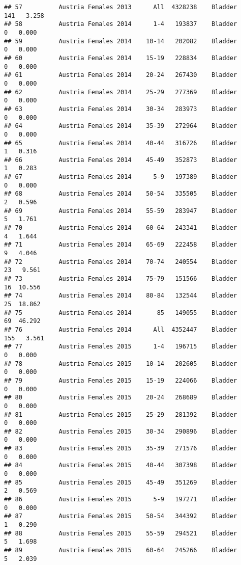 \documentclass[
]{article}
\begin{document}
\begin{verbatim}
## 57          Austria Females 2013      All  4328238    Bladder    141   3.258
## 58          Austria Females 2014      1-4   193837    Bladder      0   0.000
## 59          Austria Females 2014    10-14   202082    Bladder      0   0.000
## 60          Austria Females 2014    15-19   228834    Bladder      0   0.000
## 61          Austria Females 2014    20-24   267430    Bladder      0   0.000
## 62          Austria Females 2014    25-29   277369    Bladder      0   0.000
## 63          Austria Females 2014    30-34   283973    Bladder      0   0.000
## 64          Austria Females 2014    35-39   272964    Bladder      0   0.000
## 65          Austria Females 2014    40-44   316726    Bladder      1   0.316
## 66          Austria Females 2014    45-49   352873    Bladder      1   0.283
## 67          Austria Females 2014      5-9   197389    Bladder      0   0.000
## 68          Austria Females 2014    50-54   335505    Bladder      2   0.596
## 69          Austria Females 2014    55-59   283947    Bladder      5   1.761
## 70          Austria Females 2014    60-64   243341    Bladder      4   1.644
## 71          Austria Females 2014    65-69   222458    Bladder      9   4.046
## 72          Austria Females 2014    70-74   240554    Bladder     23   9.561
## 73          Austria Females 2014    75-79   151566    Bladder     16  10.556
## 74          Austria Females 2014    80-84   132544    Bladder     25  18.862
## 75          Austria Females 2014       85   149055    Bladder     69  46.292
## 76          Austria Females 2014      All  4352447    Bladder    155   3.561
## 77          Austria Females 2015      1-4   196715    Bladder      0   0.000
## 78          Austria Females 2015    10-14   202605    Bladder      0   0.000
## 79          Austria Females 2015    15-19   224066    Bladder      0   0.000
## 80          Austria Females 2015    20-24   268689    Bladder      0   0.000
## 81          Austria Females 2015    25-29   281392    Bladder      0   0.000
## 82          Austria Females 2015    30-34   290896    Bladder      0   0.000
## 83          Austria Females 2015    35-39   271576    Bladder      0   0.000
## 84          Austria Females 2015    40-44   307398    Bladder      0   0.000
## 85          Austria Females 2015    45-49   351269    Bladder      2   0.569
## 86          Austria Females 2015      5-9   197271    Bladder      0   0.000
## 87          Austria Females 2015    50-54   344392    Bladder      1   0.290
## 88          Austria Females 2015    55-59   294521    Bladder      5   1.698
## 89          Austria Females 2015    60-64   245266    Bladder      5   2.039

\end{verbatim}
\end{document}
